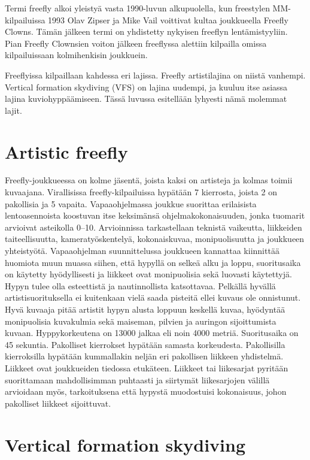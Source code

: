 
Termi freefly alkoi yleistyä vasta 1990-luvun alkupuolella, kun freestylen MM-kilpailuissa 1993 Olav Zipser ja Mike Vail voittivat kultaa joukkueella Freefly Clowns. Tämän jälkeen termi on yhdistetty nykyisen freeflyn lentämistyyliin. Pian Freefly Clownsien voiton jälkeen freeflyssa alettiin kilpailla omissa kilpailuissaan kolmihenkisin joukkuein. 


Freeflyissa kilpaillaan kahdessa eri lajissa. Freefly artistilajina on niistä vanhempi. Vertical formation skydiving (VFS) on lajina uudempi, ja kuuluu itse asiassa lajina kuviohyppäämiseen. Tässä luvussa esitellään lyhyesti nämä molemmat lajit. 

\section{ Artistic freefly }
\label{freefly-kilpailulajina-artistic-freefly}


Freefly-joukkueessa on kolme jäsentä, joista kaksi on artisteja ja kolmas toimii kuvaajana. Virallisissa freefly-kilpailuissa hypätään 7 kierrosta, joista 2 on pakollisia ja 5 vapaita. Vapaaohjelmassa joukkue suorittaa erilaisista lentoasennoista koostuvan itse keksimänsä ohjelmakokonaisuuden, jonka tuomarit arvioivat asteikolla 0–10. Arvioinnissa tarkastellaan teknistä vaikeutta, liikkeiden taiteellisuutta, kameratyöskentelyä, kokonaiskuvaa, monipuolisuutta ja joukkueen yhteistyötä. Vapaaohjelman suunnittelussa joukkueen kannattaa kiinnittää huomiota muun muassa siihen, että hypyllä on selkeä alku ja loppu, suoritusaika on käytetty hyödyllisesti ja liikkeet ovat monipuolisia sekä luovasti käytettyjä. Hypyn tulee olla esteettistä ja nautinnollista katsottavaa. Pelkällä hyvällä artistisuorituksella ei kuitenkaan vielä saada pisteitä ellei kuvaus ole onnistunut. Hyvä kuvaaja pitää artistit hypyn alusta loppuun keskellä kuvaa, hyödyntää monipuolisia kuvakulmia sekä maiseman, pilvien ja auringon sijoittumista kuvaan. Hyppykorkeutena on 13000 jalkaa eli noin 4000 metriä. Suoritusaika on 45 sekuntia. Pakolliset kierrokset hypätään samasta korkeudesta. Pakollisilla kierroksilla hypätään kummallakin neljän eri pakollisen liikkeen yhdistelmä. Liikkeet ovat joukkueiden tiedossa etukäteen. Liikkeet tai liikesarjat pyritään suorittamaan mahdollisimman puhtaasti ja siirtymät liikesarjojen välillä arvioidaan myös, tarkoituksena että hypystä muodostuisi kokonaisuus, johon pakolliset liikkeet sijoittuvat. 

\section{ Vertical formation skydiving }
\label{freefly-kilpailulajina-vertical-formation-skydiving}


